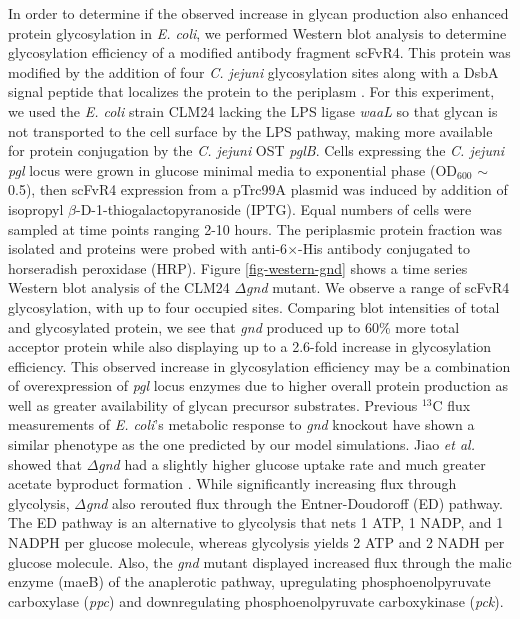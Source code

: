\documentclass[12pt]{article}
\begin{document}
In order to determine if the observed increase in glycan production also enhanced protein glycosylation in \textit{E. coli}, we performed Western blot analysis to determine glycosylation efficiency of a modified antibody fragment scFvR4. 
This protein was modified by the addition of four \textit{C. jejuni} glycosylation sites along with a DsbA signal peptide that localizes the protein to the periplasm \cite{2011-fisher-haitjema-delisa-AppEnvMicrobio}. 
For this experiment, we used the \textit{E. coli} strain CLM24 lacking the LPS ligase \textit{waaL} so that glycan is not transported to the cell surface by the LPS pathway, making more available for protein conjugation by the \textit{C. jejuni} OST \textit{pglB}. 
Cells expressing the \textit{C. jejuni} \textit{pgl} locus were grown in glucose minimal media to exponential phase (OD$_{600}$ $\sim$0.5), then scFvR4 expression from a pTrc99A plasmid was induced by addition of isopropyl $\beta$-D-1-thiogalactopyranoside (IPTG). 
Equal numbers of cells were sampled at time points ranging 2-10 hours. 
The periplasmic protein fraction was isolated and proteins were probed with anti-6$\times$-His antibody conjugated to horseradish peroxidase (HRP). 
Figure \ref{fig-western-gnd} shows a time series Western blot analysis of the CLM24 $\Delta$\textit{gnd} mutant. 
We observe a range of scFvR4 glycosylation, with up to four occupied sites. 
Comparing blot intensities of total and glycosylated protein, we see that \textit{gnd} produced up to 60\% more total acceptor protein while also displaying up to a 2.6-fold increase in glycosylation efficiency. 
This observed increase in glycosylation efficiency may be a combination of overexpression of \textit{pgl} locus enzymes due to higher overall protein production as well as greater availability of glycan precursor substrates. 
Previous $^{13}$C flux measurements of \textit{E. coli}'s metabolic response to \textit{gnd} knockout have shown a similar phenotype as the one predicted by our model simulations. 
Jiao \textit{et al.} showed that $\Delta$\textit{gnd} had a slightly higher glucose uptake rate and much greater acetate byproduct formation \cite{2003-jiao-baba-shimizu-FEMSMicrobLet}. 
While significantly increasing flux through glycolysis, $\Delta$\textit{gnd} also rerouted flux through the Entner-Doudoroff (ED) pathway. 
The ED pathway is an alternative to glycolysis that nets 1 ATP, 1 NADP, and 1 NADPH per glucose molecule, whereas glycolysis yields 2 ATP and 2 NADH per glucose molecule. 
Also, the \textit{gnd} mutant displayed increased flux through the malic enzyme (maeB) of the anaplerotic pathway, upregulating phosphoenolpyruvate carboxylase (\textit{ppc}) and downregulating phosphoenolpyruvate carboxykinase (\textit{pck}). 
\end{document}
